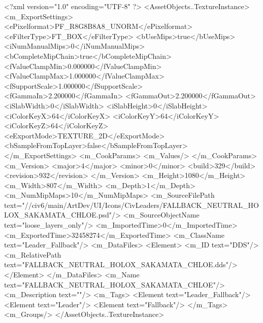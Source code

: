 <?xml version="1.0" encoding="UTF-8" ?>
<AssetObjects..TextureInstance>
	<m_ExportSettings>
		<ePixelformat>PF_R8G8B8A8_UNORM</ePixelformat>
		<eFilterType>FT_BOX</eFilterType>
		<bUseMips>true</bUseMips>
		<iNumManualMips>0</iNumManualMips>
		<bCompleteMipChain>true</bCompleteMipChain>
		<fValueClampMin>0.000000</fValueClampMin>
		<fValueClampMax>1.000000</fValueClampMax>
		<fSupportScale>1.000000</fSupportScale>
		<fGammaIn>2.200000</fGammaIn>
		<fGammaOut>2.200000</fGammaOut>
		<iSlabWidth>0</iSlabWidth>
		<iSlabHeight>0</iSlabHeight>
		<iColorKeyX>64</iColorKeyX>
		<iColorKeyY>64</iColorKeyY>
		<iColorKeyZ>64</iColorKeyZ>
		<eExportMode>TEXTURE_2D</eExportMode>
		<bSampleFromTopLayer>false</bSampleFromTopLayer>
	</m_ExportSettings>
	<m_CookParams>
		<m_Values/>
	</m_CookParams>
	<m_Version>
		<major>4</major>
		<minor>0</minor>
		<build>329</build>
		<revision>932</revision>
	</m_Version>
	<m_Height>1080</m_Height>
	<m_Width>807</m_Width>
	<m_Depth>1</m_Depth>
	<m_NumMipMaps>10</m_NumMipMaps>
	<m_SourceFilePath text="//civ6/main/ArtDev/UI/Icons/CivLeaders/FALLBACK_NEUTRAL_HOLOX_SAKAMATA_CHLOE.psd"/>
	<m_SourceObjectName text="loose_layers_only"/>
	<m_ImportedTime>0</m_ImportedTime>
	<m_ExportedTime>32458274</m_ExportedTime>
	<m_ClassName text="Leader_Fallback"/>
	<m_DataFiles>
		<Element>
			<m_ID text="DDS"/>
			<m_RelativePath text="FALLBACK_NEUTRAL_HOLOX_SAKAMATA_CHLOE.dds"/>
		</Element>
	</m_DataFiles>
	<m_Name text="FALLBACK_NEUTRAL_HOLOX_SAKAMATA_CHLOE"/>
	<m_Description text=""/>
	<m_Tags>
		<Element text="Leader_Fallback"/>
		<Element text="Leader"/>
		<Element text="Fallback"/>
	</m_Tags>
	<m_Groups/>
</AssetObjects..TextureInstance>

